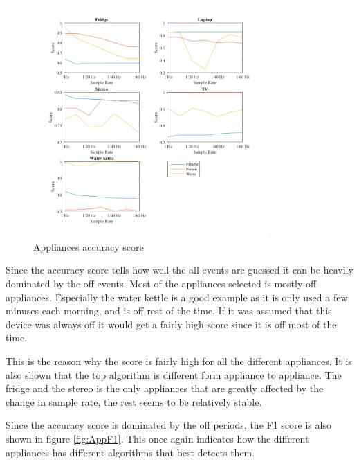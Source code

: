 \begin{figure}[H]
\centering
\includegraphics[width=0.8\textwidth]{billeder/App-AccuracyScore.png}
\caption{Appliances accuracy score}
\label{fig:AccGS}
\end{figure}

Since the accuracy score tells how well the all events are guessed it can be heavily dominated by the off events. Most of the appliances selected is mostly off appliances. Especially the water kettle is a good example as it is only used a few minuses each morning, and is off rest of the time. If it was assumed that this device was always off it would get a fairly high score since it is off most of the time.  

This is the reason why the score is fairly high for all the different appliances. It is also shown that the top algorithm is different form appliance to appliance. The fridge and the stereo is the only appliances that are greatly affected by the change in sample rate, the rest seems to be  relatively stable.

Since the accuracy score is dominated by the off periods, the F1 score is also shown in figure \ref{fig:AppF1}. This once again indicates how the different appliances has different algorithms that best detects them.  


